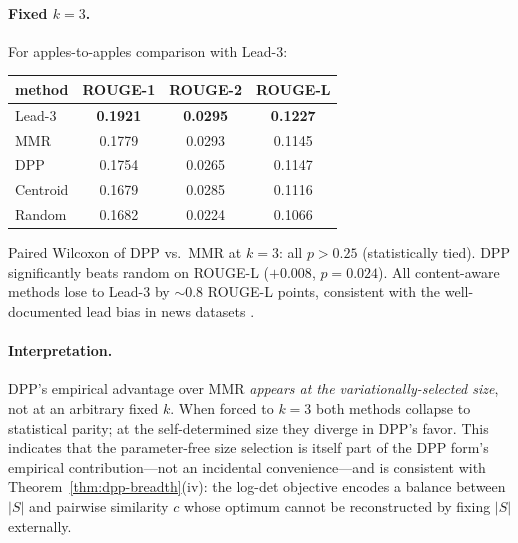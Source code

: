 \documentclass[11pt]{article}
\begin{document}
\paragraph{Fixed $k = 3$.} For apples-to-apples comparison with Lead-3:

\begin{center}
\begin{tabular}{lccc}
\toprule
method & ROUGE-1 & ROUGE-2 & ROUGE-L \\
\midrule
Lead-3   & \textbf{0.1921} & \textbf{0.0295} & \textbf{0.1227} \\
MMR      & 0.1779 & 0.0293 & 0.1145 \\
DPP      & 0.1754 & 0.0265 & 0.1147 \\
Centroid & 0.1679 & 0.0285 & 0.1116 \\
Random   & 0.1682 & 0.0224 & 0.1066 \\
\bottomrule
\end{tabular}
\end{center}

Paired Wilcoxon of DPP vs.\ MMR at $k=3$: all $p > 0.25$ (statistically tied). DPP significantly beats random on ROUGE-L ($+0.008$, $p = 0.024$). All content-aware methods lose to Lead-3 by $\sim 0.8$ ROUGE-L points, consistent with the well-documented lead bias in news datasets \cite{narayan-etal-2018-xsum}.

\paragraph{Interpretation.} DPP's empirical advantage over MMR \emph{appears at the variationally-selected size}, not at an arbitrary fixed $k$. When forced to $k=3$ both methods collapse to statistical parity; at the self-determined size they diverge in DPP's favor. This indicates that the parameter-free size selection is itself part of the DPP form's empirical contribution---not an incidental convenience---and is consistent with Theorem~\ref{thm:dpp-breadth}(iv): the log-det objective encodes a balance between $|S|$ and pairwise similarity $c$ whose optimum cannot be reconstructed by fixing $|S|$ externally.
\end{document}
